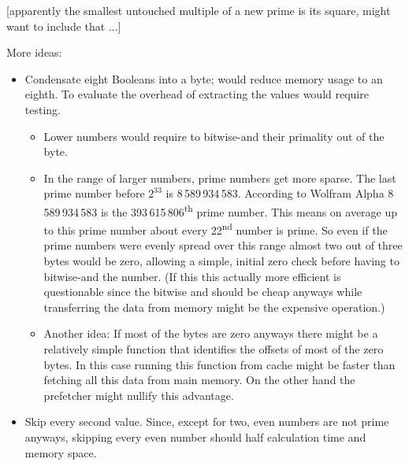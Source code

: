\documentclass[a4paper,10pt]{article}
\begin{document}
[apparently the smallest untouched multiple of a new prime is its square, might want to include that ...]

More ideas:
\begin{itemize}
 \item Condensate eight Booleans into a byte; would reduce memory usage to an eighth. To evaluate the overhead of extracting the values would require testing.
 \begin{itemize}
  \item Lower numbers would require to bitwise-and their primality out of the byte.
  \item In the range of larger numbers, prime numbers get more sparse.
  The last prime number before $2^{33}$ is 8\,589\,934\,583.
  According to Wolfram Alpha 8\,589\,934\,583 is the 393\,615\,806\textsuperscript{th} prime number.
  This means on average up to this prime number about every 22\textsuperscript{nd} number is prime.
  So even if the prime numbers were evenly spread over this range almost two out of three bytes would be zero,
  allowing a simple, initial zero check before having to bitwise-and the number.
  (If this this actually more efficient is questionable since the bitwise and should be cheap anyways
  while transferring the data from memory might be the expensive operation.)
  \item Another idea:
  If most of the bytes are zero anyways there might be a relatively simple function that identifies the offsets of most of the zero bytes.
  In this case running this function from cache might be faster than fetching all this data from main memory.
  On the other hand the prefetcher might nullify this advantage.
 \end{itemize}
 \item Skip every second value.
 Since, except for two, even numbers are not prime anyways,
 skipping every even number should half calculation time and memory space.


\end{itemize}
\end{document}
